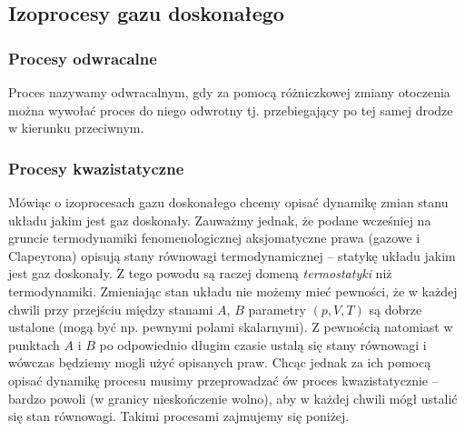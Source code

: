 \documentclass[../main.tex]{subfiles}
\begin{document}
\subsection{Izoprocesy gazu doskonałego}
\subsubsection{Procesy odwracalne}
Proces nazywamy odwracalnym, gdy za pomocą różniczkowej zmiany otoczenia można wywołać proces do niego odwrotny tj. przebiegający po tej samej drodze w kierunku przeciwnym.
\subsubsection{Procesy kwazistatyczne}
Mówiąc o izoprocesach gazu doskonałego chcemy opisać dynamikę zmian stanu układu jakim jest gaz doskonały. Zauważmy jednak, że podane wcześniej na gruncie termodynamiki fenomenologicznej aksjomatyczne prawa (gazowe i Clapeyrona) opisują stany równowagi termodynamicznej -- statykę układu jakim jest gaz doskonały. Z tego powodu są raczej domeną \textit{termostatyki} niż termodynamiki. Zmieniając stan układu nie możemy mieć pewności, że w każdej chwili przy przejściu między stanami \(A\), \(B\) parametry \((p,V,T)\) są dobrze ustalone (mogą być np. pewnymi polami skalarnymi). Z pewnością natomiast w punktach \(A\) i \(B\) po odpowiednio długim czasie ustalą się stany równowagi i wówczas będziemy mogli użyć opisanych praw. Chcąc jednak za ich pomocą opisać dynamikę procesu musimy przeprowadzać ów proces kwazistatycznie -- bardzo powoli (w granicy nieskończenie wolno), aby w każdej chwili mógł ustalić się stan równowagi. Takimi procesami zajmujemy się poniżej.
\end{document}
